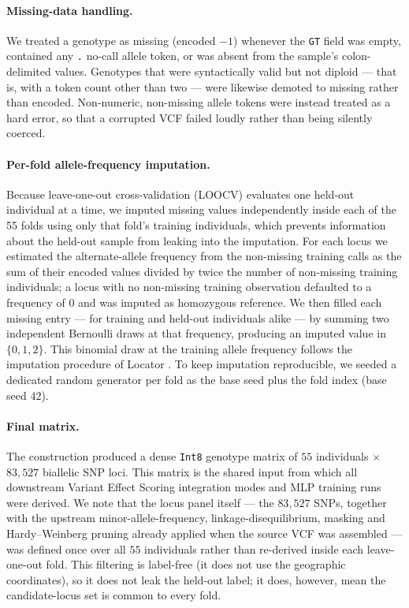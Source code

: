 \documentclass[twocolumn,10pt]{article}
\begin{document}
\paragraph{Missing-data handling.} We treated a genotype as missing (encoded $-1$) whenever the
\texttt{GT} field was empty, contained any \texttt{.} no-call allele token, or was absent from the
sample's colon-delimited values. Genotypes that were syntactically valid but not diploid --- that
is, with a token count other than two --- were likewise demoted to missing rather than encoded.
Non-numeric, non-missing allele tokens were instead treated as a hard error, so that a corrupted VCF
failed loudly rather than being silently coerced.

\paragraph{Per-fold allele-frequency imputation.} Because leave-one-out cross-validation (LOOCV)
evaluates one held-out individual at a time, we imputed missing values independently inside each of
the 55 folds using only that fold's training individuals, which prevents information about the
held-out sample from leaking into the imputation. For each locus we estimated the alternate-allele
frequency from the non-missing training calls as the sum of their encoded values divided by twice
the number of non-missing training individuals; a locus with no non-missing training observation
defaulted to a frequency of $0$ and was imputed as homozygous reference. We then filled each missing
entry --- for training and held-out individuals alike --- by summing two independent Bernoulli draws
at that frequency, producing an imputed value in $\{0, 1, 2\}$. This binomial draw at the training
allele frequency follows the imputation procedure of Locator \citep{battey2020predicting}. To keep
imputation reproducible, we seeded a dedicated random generator per fold as the base seed plus the
fold index (base seed $42$).

\paragraph{Final matrix.} The construction produced a dense \texttt{Int8} genotype matrix of $55$
individuals $\times$ $83{,}527$ biallelic SNP loci. This matrix is the shared input from which all
downstream Variant Effect Scoring integration modes and MLP training runs were derived. We note that
the locus panel itself --- the $83{,}527$ SNPs, together with the upstream minor-allele-frequency,
linkage-disequilibrium, masking and Hardy--Weinberg pruning already applied when the source VCF was
assembled --- was defined once over all $55$ individuals rather than re-derived inside each
leave-one-out fold. This filtering is label-free (it does not use the geographic coordinates), so it
does not leak the held-out label; it does, however, mean the candidate-locus set is common to every
fold.
\end{document}
